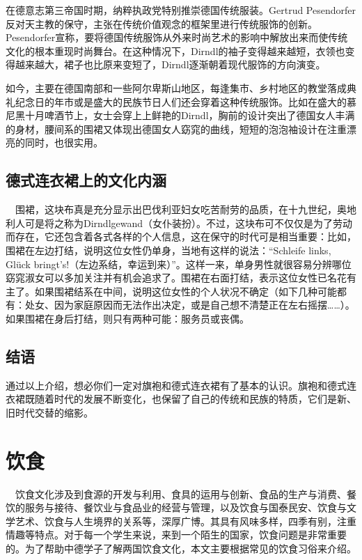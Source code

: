     在德意志第三帝国时期，纳粹执政党特别推崇德国传统服装。Gertrud Pesendorfer反对天主教的保守，主张在传统价值观念的框架里进行传统服饰的创新。Pesendorfer宣称，要将德国传统服饰从外来时尚艺术的影响中解放出来而使传统文化的根本重现时尚舞台。在这种情况下，Dirndl的袖子变得越来越短，衣领也变得越来越大，裙子也比原来变短了，Dirndl逐渐朝着现代服饰的方向演变。 

    如今，主要在德国南部和一些阿尔卑斯山地区，每逢集市、乡村地区的教堂落成典礼纪念日的年市或是盛大的民族节日人们还会穿着这种传统服饰。比如在盛大的慕尼黑十月啤酒节上，女士会穿上上鲜艳的Dirndl，胸前的设计突出了德国女人丰满的身材，腰间系的围裙又体现出德国女人窈窕的曲线，短短的泡泡袖设计在注重漂亮的同时，也很实用。 

\subsection{德式连衣裙上的文化内涵}  
     围裙，这块布真是充分显示出巴伐利亚妇女吃苦耐劳的品质，在十九世纪，奥地利人可是将之称为Dirndlgewand（女仆装扮）。不过，这块布可不仅仅是为了劳动而存在，它还包含着各式各样的个人信息，这在保守的时代可是相当重要：比如，围裙在左边打结，说明这位女性仍单身，当地有这样的说法：“Schleife links, Glück bringt’s!（左边系结，幸运到来）”。这样一来，单身男性就很容易分辨哪位窈窕淑女可以多加关注并有机会追求了。围裙在右面打结，表示这位女性已名花有主了。如果围裙结系在中间，说明这位女性的个人状况不确定（如下几种可能都有：处女、因为家庭原因而无法作出决定，或是自己想不清楚正在左右摇摆……）。如果围裙在身后打结，则只有两种可能：服务员或丧偶。 

\subsection{结语}  
    通过以上介绍，想必你们一定对旗袍和德式连衣裙有了基本的认识。旗袍和德式连衣裙既随着时代的发展不断变化，也保留了自己的传统和民族的特质，它们是新、旧时代交替的缩影。



\section{饮食}
     饮食文化涉及到食源的开发与利用、食具的运用与创新、食品的生产与消费、餐饮的服务与接待、餐饮业与食品业的经营与管理，以及饮食与国泰民安、饮食与文学艺术、饮食与人生境界的关系等，深厚广博。其具有风味多样，四季有别，注重情趣等特点。对于每一个学生来说，来到一个陌生的国家，饮食问题是非常重要的。为了帮助中德学子了解两国饮食文化，本文主要根据常见的饮食习俗来介绍。

